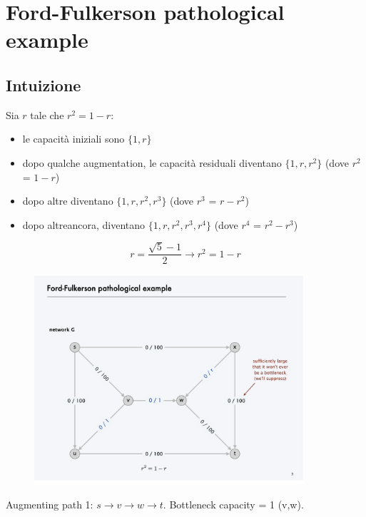 \chapter{Ford-Fulkerson pathological example}

\section{Intuizione}

Sia $r$ tale che $r^2 = 1-r$:
\begin{itemize}
	\item le capacità iniziali sono $\{1, r\}$
	\item dopo qualche augmentation, le capacità residuali
	      diventano $\{1,r,r^2\}$ (dove $r^2$ = $1-r$)
	\item dopo altre diventano $\{1,r,r^2, r^3\}$
	      (dove $r^3$ = $r-r^2$)
	\item dopo altreancora, diventano $\{1,r,r^2, r^3, r^4\}$
	      (dove $r^4$ = $r^2-r^3$)
\end{itemize}
$$
	r = \frac{\sqrt{5}-1}{2} \rightarrow r^2 = 1 - r
$$

\begin{figure}[H]
	\centering
	\includegraphics[width=10cm]{capitoli/network_flow/imgs/pathological_example.png}
\end{figure}

Augmenting path 1: $s \to v \to w \to t$. Bottleneck capacity = 1
(v,w).\\

